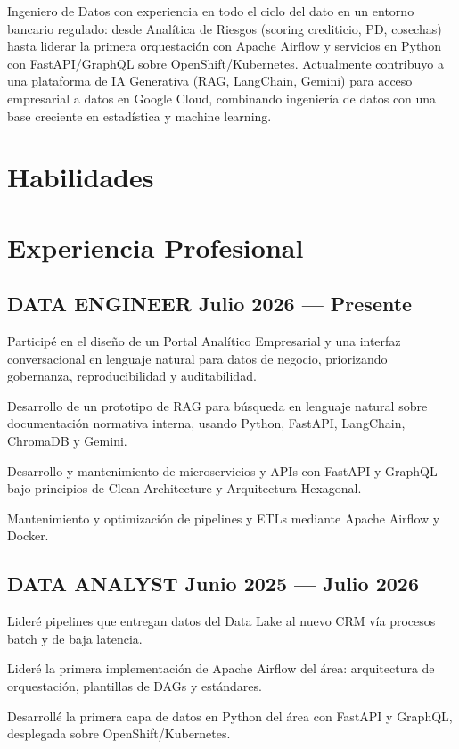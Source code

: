 \documentclass[letter,10pt]{article}
\begin{document}
Ingeniero de Datos con experiencia en todo el ciclo del dato en un entorno bancario regulado: desde Analítica de Riesgos (scoring crediticio, PD, cosechas) hasta liderar la primera orquestación con Apache Air{f}low y servicios en Python con FastAPI/GraphQL sobre OpenShift/Kubernetes. Actualmente contribuyo a una plataforma de IA Generativa (RAG, LangChain, Gemini) para acceso empresarial a datos en Google Cloud, combinando ingeniería de datos con una base creciente en estadística y machine learning.
\vspace{0.3em}

\section{Habilidades}


\section{Experiencia Profesional}
\subsection{{DATA ENGINEER \hfill Julio 2026 --- Presente}}
\begin{zitemize}
\item Participé en el diseño de un Portal Analítico Empresarial y una interfaz conversacional en lenguaje natural para datos de negocio, priorizando gobernanza, reproducibilidad y auditabilidad.
\item Desarrollo de un prototipo de RAG para búsqueda en lenguaje natural sobre documentación normativa interna, usando Python, FastAPI, LangChain, ChromaDB y Gemini.
\item Desarrollo y mantenimiento de microservicios y APIs con FastAPI y GraphQL bajo principios de Clean Architecture y Arquitectura Hexagonal.
\item Mantenimiento y optimización de pipelines y ETLs mediante Apache Air{f}low y Docker.
\end{zitemize}

\subsection{{DATA ANALYST \hfill Junio 2025 --- Julio 2026}}
\begin{zitemize}
\item Lideré pipelines que entregan datos del Data Lake al nuevo CRM vía procesos batch y de baja latencia.
\item Lideré la primera implementación de Apache Air{f}low del área: arquitectura de orquestación, plantillas de DAGs y estándares.
\item Desarrollé la primera capa de datos en Python del área con FastAPI y GraphQL, desplegada sobre OpenShift/Kubernetes.
\end{zitemize}
\end{document}
